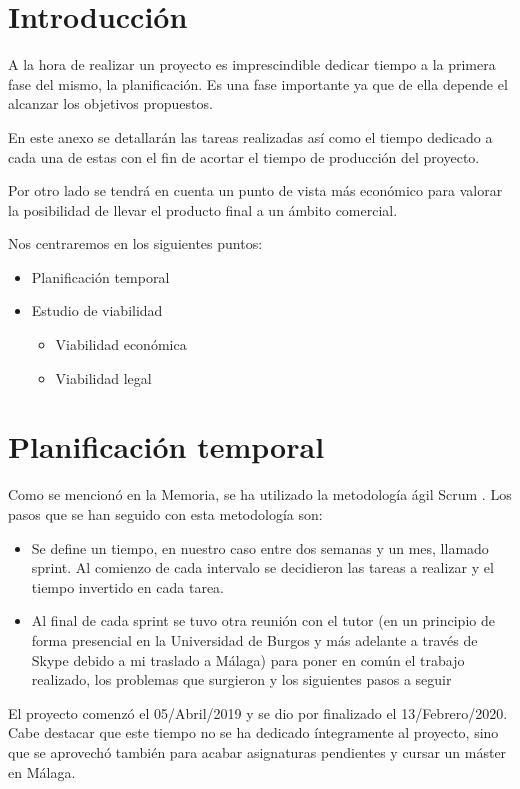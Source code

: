 
\section{Introducción}
A la hora de realizar un proyecto es imprescindible dedicar tiempo a la primera fase del mismo, la planificación. Es una fase importante ya que de ella depende el alcanzar los objetivos propuestos.

En este anexo se detallarán las tareas realizadas así como el tiempo dedicado a cada una de estas con el fin de acortar el tiempo de producción del proyecto.

Por otro lado se tendrá en cuenta un punto de vista más económico para valorar la posibilidad de llevar el producto final a un ámbito comercial.

Nos centraremos en los siguientes puntos:
\begin{itemize}
\item Planificación temporal
\item Estudio de viabilidad
\begin{itemize}
\item Viabilidad económica
\item Viabilidad legal
\end{itemize}
\end{itemize}
\section{Planificación temporal}
Como se mencionó en la Memoria, se ha utilizado la metodología ágil Scrum \cite{wiki:scrum}.
Los pasos que se han seguido con esta metodología son:
\begin{itemize}
\item Se define un tiempo, en nuestro caso entre dos semanas y un mes, llamado sprint. Al comienzo de cada intervalo se decidieron las tareas a realizar y el tiempo invertido en cada tarea.
\item Al final de cada sprint se tuvo otra reunión con el tutor (en un principio de forma presencial en la Universidad de Burgos y más adelante a través de Skype debido a mi traslado a Málaga) para poner en común el trabajo realizado, los problemas que surgieron y los siguientes pasos a seguir
\end{itemize}
El proyecto comenzó el 05/Abril/2019 y se dio por finalizado el 13/Febrero/2020. Cabe destacar que este tiempo no se ha dedicado íntegramente al proyecto, sino que se aprovechó también para acabar asignaturas pendientes y cursar un máster en Málaga.

